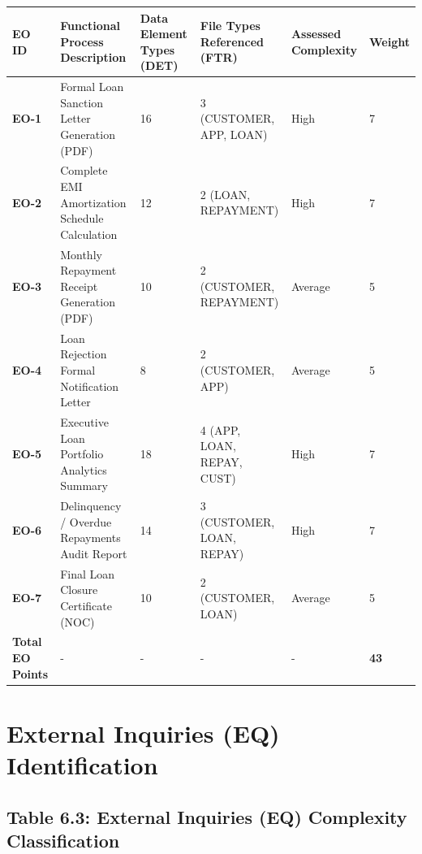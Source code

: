 \documentclass[12pt,a4paper,oneside]{report}
\begin{document}
\begin{table}[htbp]
\centering
\small
\begin{tabularx}{\textwidth}{p{2.5cm} X X X X X}
\toprule
\textbf{EO ID} & \textbf{Functional Process Description} & \textbf{Data Element Types (DET)} & \textbf{File Types Referenced (FTR)} & \textbf{Assessed Complexity} & \textbf{Weight} \\
\midrule
\textbf{EO-1} & Formal Loan Sanction Letter Generation (PDF) & 16 & 3 (CUSTOMER, APP, LOAN) & High & 7 \\
\textbf{EO-2} & Complete EMI Amortization Schedule Calculation & 12 & 2 (LOAN, REPAYMENT) & High & 7 \\
\textbf{EO-3} & Monthly Repayment Receipt Generation (PDF) & 10 & 2 (CUSTOMER, REPAYMENT) & Average & 5 \\
\textbf{EO-4} & Loan Rejection Formal Notification Letter & 8 & 2 (CUSTOMER, APP) & Average & 5 \\
\textbf{EO-5} & Executive Loan Portfolio Analytics Summary & 18 & 4 (APP, LOAN, REPAY, CUST) & High & 7 \\
\textbf{EO-6} & Delinquency / Overdue Repayments Audit Report & 14 & 3 (CUSTOMER, LOAN, REPAY) & High & 7 \\
\textbf{EO-7} & Final Loan Closure Certificate (NOC) & 10 & 2 (CUSTOMER, LOAN) & Average & 5 \\
\textbf{Total EO Points} & - & - & - & - & \textbf{43} \\
\bottomrule
\end{tabularx}
\end{table}

\section{External Inquiries (EQ) Identification}

\subsection{Table 6.3: External Inquiries (EQ) Complexity Classification}
\end{document}
